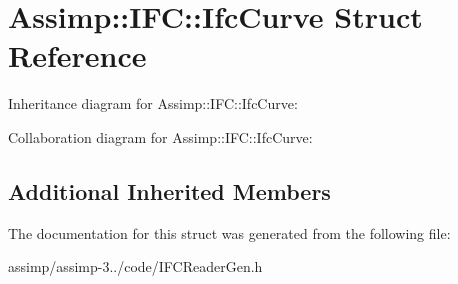 \hypertarget{struct_assimp_1_1_i_f_c_1_1_ifc_curve}{\section{Assimp\+:\+:I\+F\+C\+:\+:Ifc\+Curve Struct Reference}
\label{struct_assimp_1_1_i_f_c_1_1_ifc_curve}
}


Inheritance diagram for Assimp\+:\+:I\+F\+C\+:\+:Ifc\+Curve\+:


Collaboration diagram for Assimp\+:\+:I\+F\+C\+:\+:Ifc\+Curve\+:
\subsection*{Additional Inherited Members}


The documentation for this struct was generated from the following file\+:\begin{DoxyCompactItemize}
\item 
assimp/assimp-\/3../code/I\+F\+C\+Reader\+Gen.\+h\end{DoxyCompactItemize}
